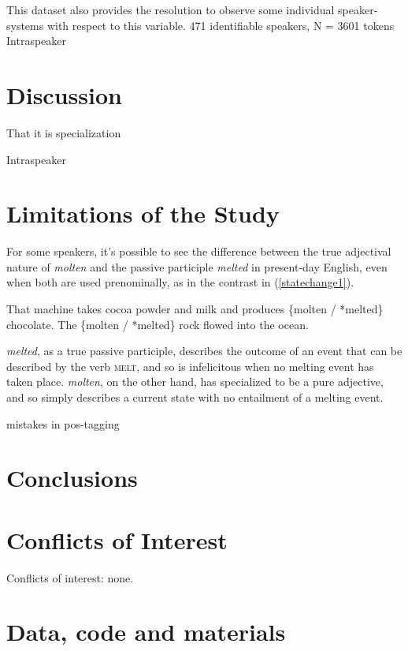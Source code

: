 \documentclass{artikel3}
\begin{document}
This dataset also provides the resolution to observe some individual speaker-systems with respect to this variable. 471 identifiable speakers, N = 3601 tokens Intraspeaker



\section{Discussion}
\label{discuss}

That it is specialization

Intraspeaker

\section{Limitations of the Study}
\label{limitations}


For some speakers, it's possible to see the difference between the true adjectival nature of \textsl{molten} and the passive participle \textsl{melted} in present-day English, even when both are used prenominally, as in the contrast in (\ref{statechange1}). 

\begin{exe}
	\ex \label{statechange1} That machine takes cocoa powder and milk and produces \{molten / *melted\} chocolate.
	\ex \label{statechange2} The \{molten / *melted\} rock flowed into the ocean.
\end{exe}

\noindent \textsl{melted}, as a true passive participle, describes the outcome of an event that can be described by the verb \textsc{melt}, and so is infelicitous when no melting event has taken place. \textsl{molten}, on the other hand, has specialized to be a pure adjective, and so simply describes a current state with no entailment of a melting event.


mistakes in pos-tagging

\section{Conclusions}




\section*{Conflicts of Interest}

Conflicts of interest: none.

\section*{Data, code and materials}
\end{document}
